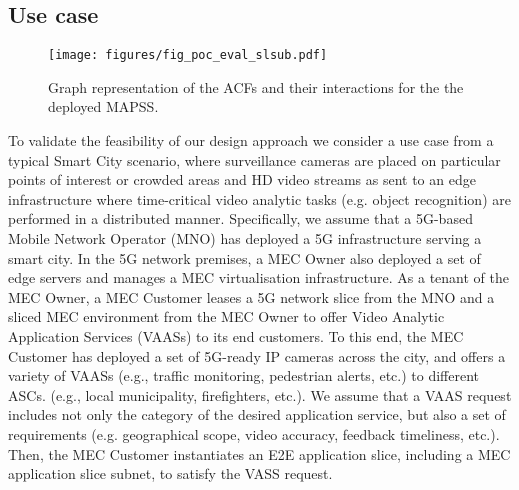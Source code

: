 \subsection{Use case}
\label{sec:use_case}
\noindent
%
%
\begin{figure*}[ht]
    \centering
    \texttt{[image: figures/fig\_poc\_eval\_slsub.pdf]}
   \caption{Graph representation of the ACFs and their interactions for the the deployed MAPSS.}
    \label{fig:poc_eval_slsub_diagram}
\end{figure*}
%
To validate the feasibility of our design approach we consider a use case from a typical Smart City scenario, where surveillance cameras are placed on particular points of interest or crowded areas and HD video streams as sent to an edge infrastructure where time-critical video analytic tasks (e.g. object recognition) are performed in a distributed manner. Specifically, we assume that a 5G-based Mobile Network Operator (MNO) has deployed a 5G infrastructure serving a smart city. In the 5G network premises, a MEC Owner also deployed a set of edge servers and manages a MEC virtualisation infrastructure. As a tenant of the MEC Owner, a MEC Customer leases a 5G network slice from the MNO and a sliced MEC environment from the MEC Owner to offer Video Analytic Application Services (VAASs) to its end customers. To this end, the MEC Customer has deployed a set of 5G-ready IP cameras across the city, and offers a variety of VAASs (e.g., traffic monitoring, pedestrian alerts, etc.) to different ASCs. (e.g., local municipality, firefighters, etc.). We assume that a VAAS request includes not only the category of the desired application service, but also a set of requirements (e.g. geographical scope, video accuracy, feedback timeliness, etc.). Then, the MEC Customer instantiates an E2E application slice, including a MEC application slice subnet, to satisfy the VASS request. 

